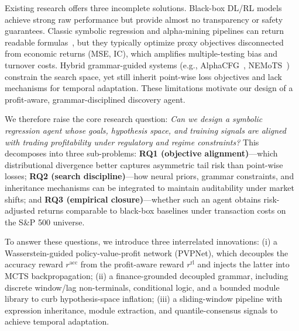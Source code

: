 \documentclass{elektr}
\theoremstyle{corollary}
\theoremstyle{lemma}
\theoremstyle{proposition}
\theoremstyle{axiom}
\theoremstyle{conjecture}
\theoremstyle{example}
\theoremstyle{definition}
\theoremstyle{remark}
\begin{document}
Existing research offers three incomplete solutions. Black-box DL/RL models achieve strong raw performance but provide almost no transparency or safety guarantees. Classic symbolic regression and alpha-mining pipelines can return readable formulas~\cite{koza1994genetic}, but they typically optimize proxy objectives disconnected from economic returns (MSE, IC), which amplifies multiple-testing bias and turnover costs. Hybrid grammar-guided systems (e.g., AlphaCFG~\cite{yang2026alpha}, NEMoTS~\cite{xie2024nemots}) constrain the search space, yet still inherit point-wise loss objectives and lack mechanisms for temporal adaptation. These limitations motivate our design of a profit-aware, grammar-disciplined discovery agent.

We therefore raise the core research question: \textit{Can we design a symbolic regression agent whose goals, hypothesis space, and training signals are aligned with trading profitability under regulatory and regime constraints?} This decomposes into three sub-problems: \textbf{RQ1 (objective alignment)}---which distributional divergence better captures asymmetric tail risk than point-wise losses; \textbf{RQ2 (search discipline)}---how neural priors, grammar constraints, and inheritance mechanisms can be integrated to maintain auditability under market shifts; and \textbf{RQ3 (empirical closure)}---whether such an agent obtains risk-adjusted returns comparable to black-box baselines under transaction costs on the S\&P 500 universe.


To answer these questions, we introduce three interrelated innovations: (i) a Wasserstein-guided policy-value-profit network (PVPNet), which decouples the accuracy reward $r^{\text{acc}}$ from the profit-aware reward $r^{\text{rl}}$ and injects the latter into MCTS backpropagation; (ii) a finance-grounded decoupled grammar, including discrete window/lag non-terminals, conditional logic, and a bounded module library to curb hypothesis-space inflation; (iii) a sliding-window pipeline with expression inheritance, module extraction, and quantile-consensus signals to achieve temporal adaptation.

\end{document}
